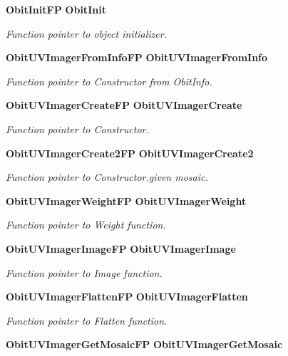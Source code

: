 \begin{CompactItemize}
{\bf Obit\-Init\-FP} {\bf Obit\-Init}
\begin{CompactList}\small\item\em Function pointer to object initializer. \item\end{CompactList}\item 
{\bf Obit\-UVImager\-From\-Info\-FP} {\bf Obit\-UVImager\-From\-Info}
\begin{CompactList}\small\item\em Function pointer to Constructor from Obit\-Info. \item\end{CompactList}\item 
{\bf Obit\-UVImager\-Create\-FP} {\bf Obit\-UVImager\-Create}
\begin{CompactList}\small\item\em Function pointer to Constructor. \item\end{CompactList}\item 
{\bf Obit\-UVImager\-Create2FP} {\bf Obit\-UVImager\-Create2}
\begin{CompactList}\small\item\em Function pointer to Constructor.given mosaic. \item\end{CompactList}\item 
{\bf Obit\-UVImager\-Weight\-FP} {\bf Obit\-UVImager\-Weight}
\begin{CompactList}\small\item\em Function pointer to Weight function. \item\end{CompactList}\item 
{\bf Obit\-UVImager\-Image\-FP} {\bf Obit\-UVImager\-Image}
\begin{CompactList}\small\item\em Function pointer to Image function. \item\end{CompactList}\item 
{\bf Obit\-UVImager\-Flatten\-FP} {\bf Obit\-UVImager\-Flatten}
\begin{CompactList}\small\item\em Function pointer to Flatten function. \item\end{CompactList}\item 
{\bf Obit\-UVImager\-Get\-Mosaic\-FP} {\bf Obit\-UVImager\-Get\-Mosaic}

\end{CompactItemize}
